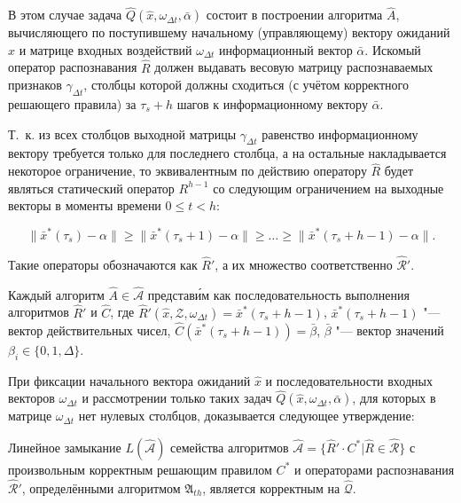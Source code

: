 В этом случае задача $\hat{Q}(\hat{x}, \omega_{{\Delta}t}, \bar{\alpha})$ состоит в построении алгоритма $\hat A$, вычисляющего по поступившему начальному (управляющему) вектору ожиданий $\hat{x}$ и матрице входных воздействий $\omega_{{\Delta}t}$  информационный вектор $\bar{\alpha}$. Искомый оператор распознавания $\hat{R}$ должен выдавать весовую матрицу распознаваемых признаков $\gamma_{\Delta{t}}$, столбцы которой должны сходиться (с учётом корректного решающего правила) за $\tau_s+h$ шагов к информационному вектору $\bar\alpha$.

Т.~к. из всех столбцов выходной матрицы $\gamma_{\Delta t}$ равенство информационному вектору требуется только для последнего столбца, а на остальные накладывается некоторое ограничение, то эквивалентным по действию оператору $\hat R$ будет являться статический оператор $R^{h-1}$ со следующим ограничением на выходные векторы в моменты времени $0\leqslant t<h$:

\[
\|\bar x^*(\tau_s)-\alpha\|\geqslant \|\bar x^*(\tau_s+1)-\alpha\|\geqslant \dots\geqslant\|\bar x^*(\tau_s+h-1)-\alpha\|.
\]

Такие операторы обозначаются как $\hat R'$, а их множество соответственно $\hat{\mathcal R}'$. 

\begin{Pred}\label{st:decompositon_dyn}
	Каждый алгоритм $\hat{ A}\in\hat{\mathcal{A}}$ представ\'{и}м как последовательность выполнения алгоритмов $\hat R'$ и $\hat{C}$, где $\hat R'(\hat x, \mathcal{Z}, \omega_{\Delta{t}})=\bar x^*(\tau_s+h-1)$, $\bar x^*(\tau_s+h-1)$ "--- вектор действительных чисел, $\hat C(\bar x^*(\tau_s+h-1))=\bar\beta$, $\bar\beta$ "--- вектор значений $\beta_i\in\{0,1,\Delta\}$.
\end{Pred}

При фиксации начального вектора ожиданий $\hat{x}$ и последовательности входных векторов $\omega_{\Delta{t}}$ и рассмотрении только таких задач $\hat{Q}(\hat{x},\omega_{\Delta{t}},\bar{\alpha})$, для которых в матрице $\omega_{\Delta{t}}$ нет нулевых столбцов, доказывается следующее утверждение:
\begin{Theorem}\label{th:dyn_correct}
	Линейное замыкание $L(\hat{\mathcal A})$ семейства алгоритмов $\hat{\mathcal A}=\{\hat R'{\cdot}C^*|\hat R\in\hat{\mathcal R}\}$ с произвольным корректным решающим правилом $C^*$ и операторами распознавания $\hat{\mathcal R}'$, определёнными алгоритмом $\mathfrak{A}_{th}$, является корректным на $\hat{\mathcal Q}$.
\end{Theorem}

